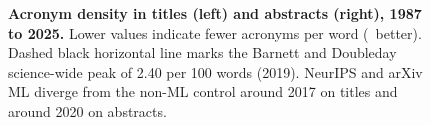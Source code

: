 \begin{figure}[h]
\vspace{2mm}

\caption{\textbf{Acronym density in titles (left) and abstracts
  (right), 1987 to 2025.}
  Lower values indicate fewer acronyms per word (\textdownarrow\
  better). Dashed black horizontal line marks the Barnett and
  Doubleday science-wide peak of 2.40 per 100 words (2019).
  NeurIPS and arXiv ML diverge from the non-ML control around
  2017 on titles and around 2020 on abstracts.}
\label{fig:acronyms}
\end{figure}
